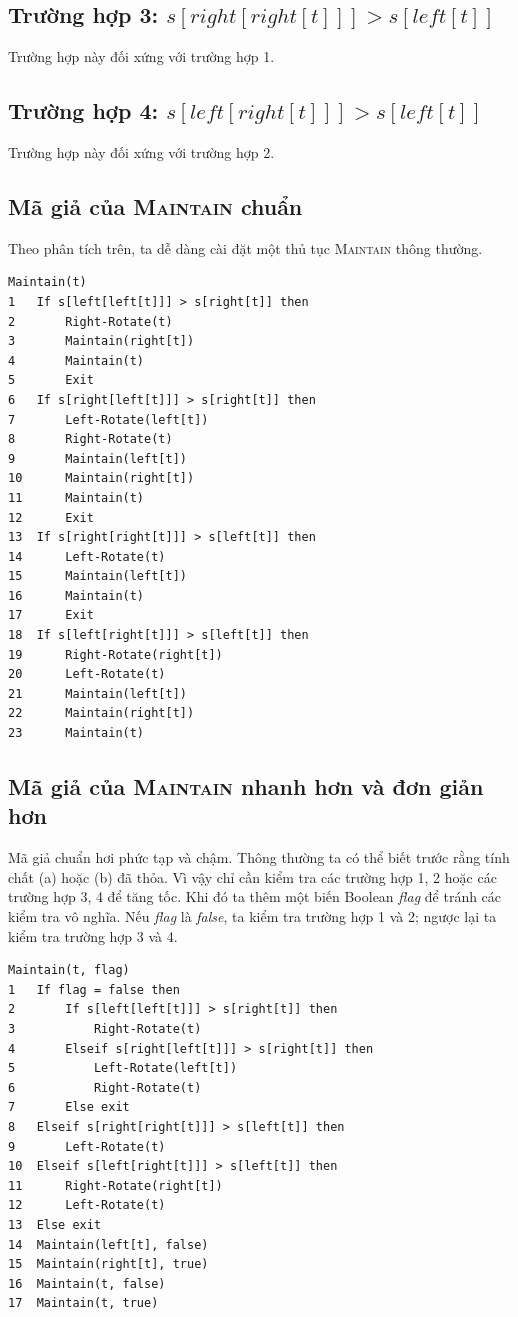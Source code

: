 \documentclass[11pt]{article}
\begin{document}
\subsection*{Trường hợp 3: $s[\mathit{right}[\mathit{right}[t]]]>s[\mathit{left}[t]]$}

Trường hợp này đối xứng với trường hợp 1.

\subsection*{Trường hợp 4: $s[\mathit{left}[\mathit{right}[t]]]>s[\mathit{left}[t]]$}

Trường hợp này đối xứng với trường hợp 2.

\subsection{Mã giả của \textsc{Maintain} chuẩn}

Theo phân tích trên, ta dễ dàng cài đặt một thủ tục \textsc{Maintain} thông
thường.

\begin{verbatim}
Maintain(t)
1   If s[left[left[t]]] > s[right[t]] then
2       Right-Rotate(t)
3       Maintain(right[t])
4       Maintain(t)
5       Exit
6   If s[right[left[t]]] > s[right[t]] then
7       Left-Rotate(left[t])
8       Right-Rotate(t)
9       Maintain(left[t])
10      Maintain(right[t])
11      Maintain(t)
12      Exit
13  If s[right[right[t]]] > s[left[t]] then
14      Left-Rotate(t)
15      Maintain(left[t])
16      Maintain(t)
17      Exit
18  If s[left[right[t]]] > s[left[t]] then
19      Right-Rotate(right[t])
20      Left-Rotate(t)
21      Maintain(left[t])
22      Maintain(right[t])
23      Maintain(t)
\end{verbatim}

\subsection{Mã giả của \textsc{Maintain} nhanh hơn và đơn giản hơn}

Mã giả chuẩn hơi phức tạp và chậm. Thông thường ta có thể biết trước rằng
tính chất (a) hoặc (b) đã thỏa. Vì vậy chỉ cần kiểm tra các trường hợp 1, 2
hoặc các trường hợp 3, 4 để tăng tốc. Khi đó ta thêm một biến Boolean
\textit{flag} để tránh các kiểm tra vô nghĩa. Nếu \textit{flag} là
\textit{false}, ta kiểm tra trường hợp 1 và 2; ngược lại ta kiểm tra trường
hợp 3 và 4.

\begin{verbatim}
Maintain(t, flag)
1   If flag = false then
2       If s[left[left[t]]] > s[right[t]] then
3           Right-Rotate(t)
4       Elseif s[right[left[t]]] > s[right[t]] then
5           Left-Rotate(left[t])
6           Right-Rotate(t)
7       Else exit
8   Elseif s[right[right[t]]] > s[left[t]] then
9       Left-Rotate(t)
10  Elseif s[left[right[t]]] > s[left[t]] then
11      Right-Rotate(right[t])
12      Left-Rotate(t)
13  Else exit
14  Maintain(left[t], false)
15  Maintain(right[t], true)
16  Maintain(t, false)
17  Maintain(t, true)
\end{verbatim}
\end{document}
